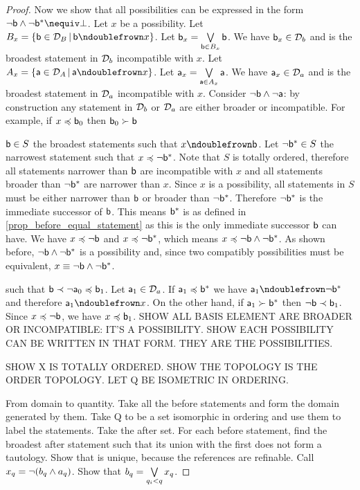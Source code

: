 \documentclass[11pt,letterpaper,fleqn]{memoir} %
\begin{document}
\begin{mathSection}
\begin{proof}
	Now we show that all possibilities can be expressed in the form $\NOT \stmt[b] \AND \NOT \stmt[b]^* \nequiv \contradiction$. Let $x$ be a possibility. Let $B_x = \{ \stmt[b] \in \edomain_B \, | \, \stmt[b] \ncomp x\}$. Let $\stmt[b]_x = \bigOR\limits_{\stmt[b] \in B_x} \stmt[b]$. We have $\stmt[b]_x \in \edomain_b$ and is the broadest statement in $\edomain_b$ incompatible with $x$. Let $A_x = \{ \stmt[a] \in \edomain_A \, | \, \stmt[a] \ncomp x\}$. Let $\stmt[a]_x = \bigOR\limits_{\stmt[a] \in A_x} \stmt[a]$. We have $\stmt[a]_x \in \edomain_a$ and is the broadest statement in $\edomain_a$ incompatible with $x$. Consider $\NOT \stmt[b] \AND \NOT \stmt[a]$: by construction any statement in $\edomain_b$ or $\edomain_a$ are either broader or incompatible. For example, if $x \narrower \stmt[b]_0$ then $\stmt[b]_0 \sbroader \stmt[b]$
	
	 $\stmt[b] \in S$ the broadest statements such that $x \ncomp \stmt[b]$. Let $\NOT \stmt[b]^* \in S$ the narrowest statement such that $x \narrower \NOT \stmt[b]^*$. Note that $S$ is totally ordered, therefore all statements narrower than $\stmt[b]$ are incompatible with $x$ and all statements broader than $\NOT \stmt[b]^*$ are narrower than $x$. Since $x$ is a possibility, all statements in $S$ must be either narrower than $\stmt[b]$ or broader than $\NOT \stmt[b]^*$. Therefore $\NOT \stmt[b]^*$ is the immediate successor of $\stmt[b]$. This means $\stmt[b]^*$ is as defined in \ref{prop_before_equal_statement} as this is the only immediate successor $\stmt[b]$ can have. We have $x \narrower \NOT \stmt[b]$ and $x \narrower \NOT \stmt[b]^*$, which means $x \narrower \NOT \stmt[b] \AND \NOT \stmt[b]^*$. As shown before, $\NOT \stmt[b] \AND \NOT \stmt[b]^*$ is a possibility and, since two compatibly possibilities must be equivalent, $x \equiv \NOT \stmt[b] \AND \NOT \stmt[b]^*$.
	
	such that $\stmt[b] \snarrower \NOT \stmt[a]_0 \narrower \stmt[b]_1$.  Let $\stmt[a]_1 \in \edomain_a$. If $\stmt[a]_1 \narrower \stmt[b]^*$ we have $\stmt[a]_1\ncomp \NOT \stmt[b]^*$ and therefore $\stmt[a]_1 \ncomp x$. On the other hand, if $\stmt[a]_1 \sbroader \stmt[b]^*$ then $\NOT \stmt[b] \snarrower \stmt[b]_1$. Since $x \narrower \NOT \stmt[b]$, we have $x \narrower \stmt[b]_1$.  SHOW ALL BASIS ELEMENT ARE BROADER OR INCOMPATIBLE: IT'S A POSSIBILITY. SHOW EACH POSSIBILITY CAN BE WRITTEN IN THAT FORM. THEY ARE THE POSSIBILITIES.
	
	SHOW X IS TOTALLY ORDERED. SHOW THE TOPOLOGY IS THE ORDER TOPOLOGY. LET Q BE ISOMETRIC IN ORDERING. 
	
	From domain to quantity. Take all the before statements and form the domain generated by them. Take Q to be a set isomorphic in ordering and use them to label the statements. Take the after set. For each before statement, find the broadest after statement such that its union with the first does not form a tautology. Show that is unique, because the references are refinable. Call $x_q = \NOT (b_q \AND a_q)$. Show that $b_q = \bigOR\limits_{q_i < q} x_q$.
\end{proof}
\end{mathSection}
\end{document}
